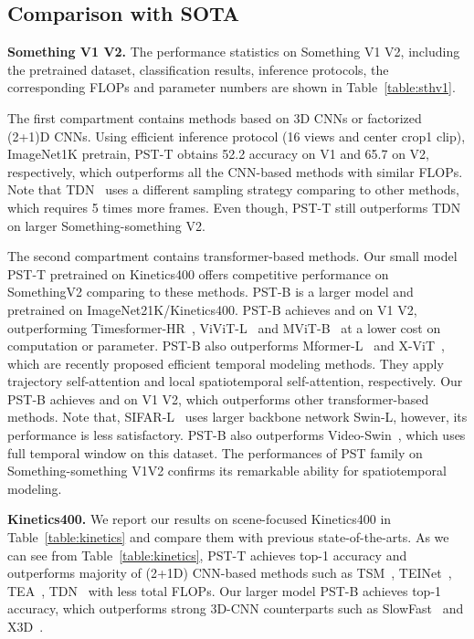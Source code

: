 \documentclass[runningheads]{llncs}
\begin{document}
	
	
	
	\subsection{Comparison with SOTA}
	
	\textbf{Something V1  V2.} The performance statistics on Something V1  V2, including the pretrained dataset, classification results, inference protocols, the corresponding FLOPs and parameter numbers are shown in Table~\ref{table:sthv1}.
	
	The first compartment contains methods based on 3D CNNs or factorized (2+1)D CNNs. Using efficient inference protocol (16 views and center crop1 clip), ImageNet1K pretrain, PST-T obtains 52.2 accuracy on V1 and 65.7 on V2, respectively, which outperforms all the CNN-based methods with similar FLOPs. Note that TDN~\cite{wang2021tdn} uses a different sampling strategy comparing to other methods, which requires 5 times more frames. Even though, PST-T still outperforms TDN on larger Something-something V2.
	
	The second compartment contains transformer-based methods. Our small model PST-T pretrained on Kinetics400 offers competitive performance on SomethingV2 comparing to these methods. PST-B is a larger model and pretrained on ImageNet21K/Kinetics400. PST-B achieves  and  on V1  V2, outperforming Timesformer-HR~\cite{GedasBertasius2021IsSA}, ViViT-L~\cite{AnuragArnab2021ViViTAV} and MViT-B~\cite{Fan_2021_ICCV} at a lower cost on computation or parameter. PST-B also outperforms Mformer-L~\cite{patrick2021keeping} and X-ViT~\cite{bulat2021space}, which are recently proposed efficient temporal modeling methods. They apply trajectory self-attention and local spatiotemporal self-attention, respectively. Our PST-B achieves  and  on V1  V2, which outperforms other transformer-based methods. Note that, SIFAR-L~\cite{SIFAR} uses larger backbone network Swin-L, however, its performance is less satisfactory. PST-B also outperforms Video-Swin~\cite{ZeLiu2021VideoST}, which uses full temporal window on this dataset. The performances of PST family on Something-something V1V2 confirms its remarkable ability for spatiotemporal modeling. 
	
	
	
	\textbf{Kinetics400.} We report our results on scene-focused Kinetics400 in Table~\ref{table:kinetics} and compare them with previous state-of-the-arts. As we can see from Table~\ref{table:kinetics}, PST-T achieves  top-1 accuracy and outperforms majority of (2+1D) CNN-based methods such as TSM~\cite{lin2019tsm}, TEINet~\cite{liu2020teinet}, TEA~\cite{li2020tea}, TDN~\cite{wang2021tdn} with less total FLOPs. Our larger model PST-B achieves  top-1 accuracy, which outperforms strong 3D-CNN counterparts such as SlowFast~\cite{feichtenhofer2019slowfast} and X3D~\cite{Feichtenhofer_2020_CVPR}. 
	
\end{document}

